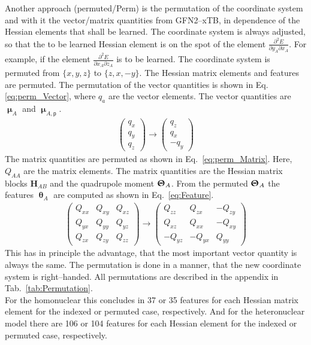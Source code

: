 Another approach (permuted/Perm) is the permutation of the coordinate system 
and with it the \mbox{vector/matrix} quantities from GFN2--xTB,
in dependence of the Hessian elements that shall be learned.
The coordinate system is always adjusted,
so that the to be learned Hessian element is on the spot of the element  $\frac{\partial^2 E }{\partial y_A \partial x_A}$.
For example, if the element $\frac{\partial^2 E }{\partial x_A \partial z_A}$ is to be learned.
The coordinate system is permuted from $\{x,y,z\}$ to $\{z,x,-y\}$.
The Hessian matrix elements and features are permuted.
The permutation of the vector quantities is shown in Eq.\eqref{eq:perm_Vector}, where $q_a$ are the vector elements. The vector quantities are $\bm{\upmu}_{A}$ and $\bm{\upmu}_{A,\mathsf{p}}$.
\begin{align}
	\label{eq:perm_Vector}
	\left(\begin{matrix}
		q_x\\
		q_y\\
		q_z
	\end{matrix}\right) \longrightarrow 	
	\left(\begin{matrix}
		q_z\\
		q_x\\
		-q_y
	\end{matrix}\right)
\end{align}
The matrix quantities are permuted as shown in Eq.~\eqref{eq:perm_Matrix}. Here, $Q_{AA}$ are the matrix elements.
The matrix quantities are the Hessian matrix blocks $\bm{H}_{AB}$ and the quadrupole moment $\bm{\Uptheta}_A$.
From the permuted $\bm{\Uptheta}_A$ the features $\bm{\uptheta}_A$ are computed as shown in Eq.~\eqref{eq:Feature}.
\begin{align}
	\label{eq:perm_Matrix}
	\left(\begin{matrix}
		Q_{xx}  & Q_{xy} & Q_{xz} \\
		Q_{yx}  & Q_{yy} & Q_{yz} \\
		Q_{zx}  & Q_{zy} & Q_{zz} 
	\end{matrix}\right) 
	\longrightarrow 	\left(\begin{matrix}
		Q_{zz}  & Q_{zx} & -Q_{zy} \\
		Q_{xz}  & Q_{xx} & -Q_{xy} \\
		-Q_{yz}  & -Q_{yx} & Q_{yy} 
	\end{matrix}\right)
\end{align}
This has in principle the advantage, that the most important vector quantity is always the same.
The permutation is done in a manner, that the new coordinate system is right--handed.
All permutations are described in the appendix in Tab.~\ref{tab:Permutation}.\\
For the homonuclear this concludes in 37 or 35 features for each Hessian matrix element for the indexed or permuted case, respectively.
And for the heteronuclear model there are 106 or 104 features for each Hessian element for the indexed or permuted case, respectively.
\newpage
